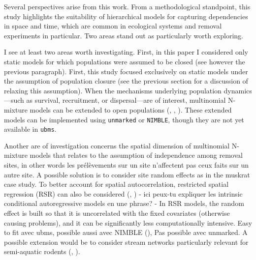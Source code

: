 \documentclass[
  11pt,
  a4paper,
]{article}
\begin{document}
Several perspectives arise from this work. From a methodological standpoint, this study highlights the suitability of hierarchical models for capturing dependencies in space and time, which are common in ecological systems and removal experiments in particular. Two areas stand out as particularly worth exploring.

I see at least two areas worth investigating. First, in this paper I considered only static models for which populations were assumed to be closed (see however the previous paragraph). First, this study focused exclusively on static models under the assumption of population closure (see the previous section for a discussion of relaxing this assumption). When the mechanisms underlying population dynamics---such as survival, recruitment, or dispersal---are of interest, multinomial N-mixture models can be extended to open populations (, , ). These extended models can be implemented using \texttt{unmarked} or \texttt{NIMBLE}, though they are not yet available in \texttt{ubms}.

Another are of investigation concerns the spatial dimension of multinomial N-mixture models that relates to the assumption of independence among removal sites, in other words les prélèvements sur un site n'affectent pas ceux faits sur un autre site. A possible solution is to consider site random effects as in the muskrat case study. To better account for spatial autocorrelation, restricted spatial regression (RSR) can also be considered (, ) - ici peux-tu expliquer les intrinsic conditional autoregressive models en une phrase? - In RSR models, the random effect is built so that it is uncorrelated with the fixed covariates (otherwise causing problems), and it can be significantly less computationally intensive. Easy to fit avec ubms, possible aussi avec NIMBLE (), Pas possible avec unmarked. A possible extension would be to consider stream networks particularly relevant for semi-aquatic rodents (, ).
\end{document}
